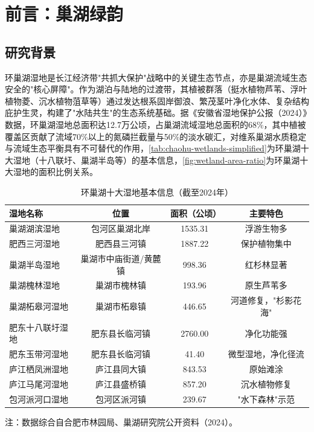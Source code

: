 
\section{前言：巢湖绿韵}
\subsection{研究背景}
环巢湖湿地是长江经济带"共抓大保护"战略中的关键生态节点，亦是巢湖流域生态安全的"核心屏障"。作为湖泊与陆地的过渡带，其植被群落（挺水植物芦苇、浮叶植物菱、沉水植物菹草等）通过发达根系固岸御浪、繁茂茎叶净化水体、复杂结构庇护生灵，构建了"水陆共生"的生态系统基础。据《安徽省湿地保护公报（2024）》数据\cite{chu2023}，环巢湖湿地总面积达12.7万公顷，占巢湖流域湿地总面积的68\%，其中植被覆盖区贡献了流域70\%以上的氮磷拦截量与50\%的淡水碳汇，对维系巢湖水质稳定与流域生态平衡具有不可替代的作用，\autoref{tab:chaohu-wetlands-simplified}为环巢湖十大湿地（十八联圩、巢湖半岛等）的基本信息，\autoref{fig:wetland-area-ratio}为环巢湖十大湿地的面积比例关系。
\begin{table}[htbp]
\centering
\caption{环巢湖十大湿地基本信息（截至2024年）}
\label{tab:chaohu-wetlands-simplified}
\begin{tabular}{lccc}
\toprule
\textbf{湿地名称} & \textbf{位置} & \textbf{面积（公顷）} & \textbf{主要特色} \\
\midrule
巢湖湖滨湿地 & 包河区巢湖北岸 & 1535.31 & 浮游生物多 \\
肥西三河湿地 & 肥西县三河镇 & 1887.22 & 保护植物集中 \\
巢湖半岛湿地 & 巢湖市中庙街道/黄麓镇 & 998.36 & 红杉林显著 \\
巢湖槐林湿地 & 巢湖市槐林镇 & 193.96 & 原生芦苇多 \\
巢湖柘皋河湿地 & 巢湖市柘皋镇 & 446.65 & 河道修复，"杉影花海" \\
肥东十八联圩湿地 & 肥东县长临河镇 & 2760.00 & 净化功能强 \\
肥东玉带河湿地 & 肥东县长临河镇 & 41.40 & 微型湿地，净化径流 \\
庐江栖凤洲湿地 & 庐江县同大镇 & 843.53 & 原始滩涂 \\
庐江马尾河湿地 & 庐江县盛桥镇 & 857.20 & 沉水植物修复 \\
包河派河口湿地 & 包河区派河镇 & 239.67 & "水下森林"示范 \\
\bottomrule
\end{tabular}
\footnotesize{注：数据综合自合肥市林园局、巢湖研究院公开资料（2024）。}
\end{table}

